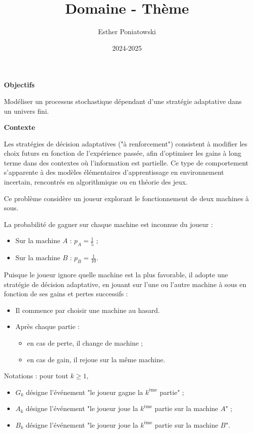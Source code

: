 \documentclass[10pt,a4paper]{article}
\title{Domaine - Thème}
\author{Esther Poniatowski}
\date{2024-2025}
\begin{document}
\textbf{Objectifs}

Modéliser un processus stochastique  dépendant d'une stratégie adaptative dans un univers
fini.

\bigskip
\textbf{Contexte}

Les stratégies de décision adaptatives ("à renforcement") consistent à modifier les choix futurs en
fonction de l'expérience passée, afin d'optimiser les gains à long terme dans des contextes où
l'information est partielle. Ce type de comportement s'apparente à des modèles élémentaires
d'apprentissage en environnement incertain, rencontrés en algorithmique ou en théorie des jeux.

\bigskip
Ce problème considère un joueur explorant le fonctionnement de deux machines à sous.

La probabilité de gagner sur chaque machine est inconnue du joueur :
\begin{itemize}
 \item Sur la machine \( A \) : \( p_A = \frac{1}{5} \) ;
 \item Sur la machine \( B \) : \( p_B = \frac{1}{10} \).
\end{itemize}

Puisque le joueur ignore quelle machine est la plus favorable, il adopte une stratégie de décision
adaptative, en jouant sur l'une ou l'autre machine à sous en fonction de ses gains et pertes
successifs :
\begin{itemize}
 \item Il commence par choisir une machine au hasard.
 \item Après chaque partie :
   \begin{itemize}
    \item en cas de perte, il change de machine ;
    \item en cas de gain, il rejoue sur la même machine.
   \end{itemize}
\end{itemize}

\bigskip
Notations : pour tout \( k \geq 1 \),
\begin{itemize}
 \item \( G_k \) désigne l'événement "le joueur gagne la \( k^\text{ème} \) partie" ;
 \item \( A_k \) désigne l'événement "le joueur joue la \( k^\text{ème} \) partie sur la machine \(
 A \)" ;
 \item \( B_k \) désigne l'événement "le joueur joue la \( k^\text{ème} \) partie sur la machine \(
 B \)".
\end{itemize}
\end{document}
